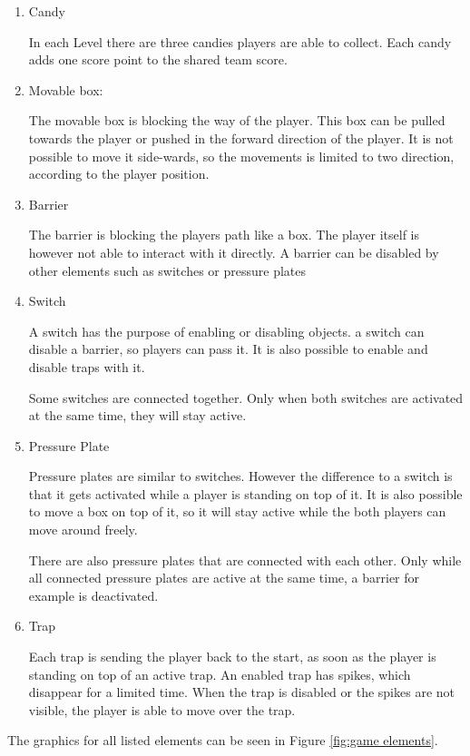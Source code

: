 \begin{enumerate}
    \item Candy
    
    In each Level there are three candies players are able to collect. Each candy adds one score point to the shared team score.
    \item Movable box:   
    
    The movable box is blocking the way of the player. This box can be pulled towards the player or pushed in the forward direction of the player. It is not possible to move it side-wards, so the movements is limited to two direction, according to the player position.
    \item Barrier
    
    The barrier is blocking the players path like a box. The player itself is however not able to interact with it directly. A barrier can be disabled by other elements such as switches or pressure plates
    \item Switch
    
    A switch has the purpose of enabling or disabling objects. a switch can disable a barrier, so players can pass it.
    It is also possible to enable and disable traps with it.
    
    Some switches are connected together. Only when both switches are activated at the same time, they will stay active.
    \item Pressure Plate
    
    Pressure plates are similar to switches. However the difference to a switch is that it gets activated while a player is standing on top of it. It is also possible to move a box on top of it, so it will stay active while the both players can move around freely.
    
    There are also pressure plates that are connected with each other. Only while all connected pressure plates are active at the same time, a barrier for example is deactivated.
    \item Trap
    
    Each trap is sending the player back to the start, as soon as the player is standing on top of an active trap. An enabled trap has spikes, which disappear for a limited time. When the trap is disabled or the spikes are not visible, the player is able to move over the trap.
\end{enumerate}

The graphics for all listed elements can be seen in Figure \ref{fig:game elements}.

